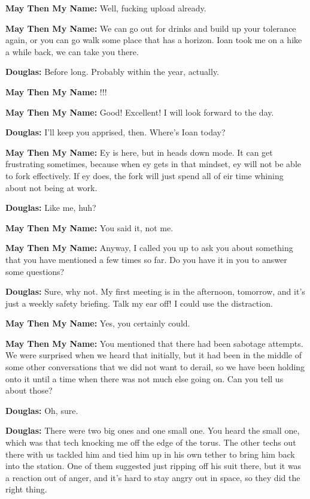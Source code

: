 \textbf{May Then My Name:} Well, fucking upload already.

\textbf{May Then My Name:} We can go out for drinks and build up your tolerance again, or you can go walk some place that has a horizon. Ioan took me on a hike a while back, we can take you there.

\textbf{Douglas:} Before long. Probably within the year, actually.

\textbf{May Then My Name:} !!!

\textbf{May Then My Name:} Good! Excellent! I will look forward to the day.

\textbf{Douglas:} I'll keep you apprised, then. Where's Ioan today?

\textbf{May Then My Name:} Ey is here, but in heads down mode. It can get frustrating sometimes, because when ey gets in that mindset, ey will not be able to fork effectively. If ey does, the fork will just spend all of eir time whining about not being at work.

\textbf{Douglas:} Like me, huh?

\textbf{May Then My Name:} You said it, not me.

\textbf{May Then My Name:} Anyway, I called you up to ask you about something that you have mentioned a few times so far. Do you have it in you to answer some questions?

\textbf{Douglas:} Sure, why not. My first meeting is in the afternoon, tomorrow, and it's just a weekly safety briefing. Talk my ear off! I could use the distraction.

\textbf{May Then My Name:} Yes, you certainly could.

\textbf{May Then My Name:} You mentioned that there had been sabotage attempts. We were surprised when we heard that initially, but it had been in the middle of some other conversations that we did not want to derail, so we have been holding onto it until a time when there was not much else going on. Can you tell us about those?

\textbf{Douglas:} Oh, sure.

\textbf{Douglas:} There were two big ones and one small one. You heard the small one, which was that tech knocking me off the edge of the torus. The other techs out there with us tackled him and tied him up in his own tether to bring him back into the station. One of them suggested just ripping off his suit there, but it was a reaction out of anger, and it's hard to stay angry out in space, so they did the right thing.

